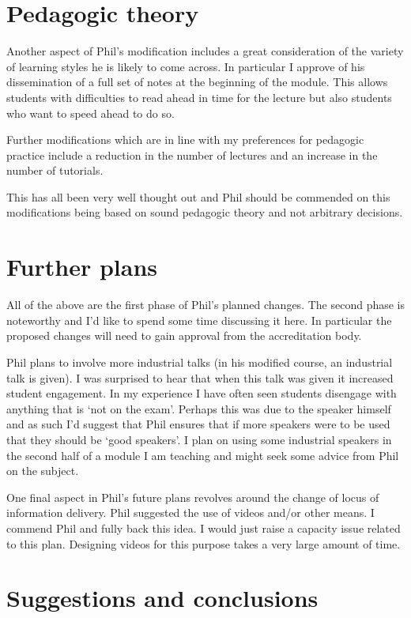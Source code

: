 \documentclass{article}
\begin{document}
\section{Pedagogic theory}

Another aspect of Phil's modification includes a great consideration of the variety of learning styles he is likely to come across. In particular I approve of his dissemination of a full set of notes at the beginning of the module. This allows students with difficulties to read ahead in time for the lecture but also students who want to speed ahead to do so.

Further modifications which are in line with my preferences for pedagogic practice include a reduction in the number of lectures and an increase in the number of tutorials.

This has all been very well thought out and Phil should be commended on this modifications being based on sound pedagogic theory and not arbitrary decisions.

\section{Further plans}

All of the above are the first phase of Phil's planned changes. The second phase is noteworthy and I'd like to spend some time discussing it here. In particular the proposed changes will need to gain approval from the accreditation body.

Phil plans to involve more industrial talks (in his modified course, an industrial talk is given). I was surprised to hear that when this talk was given it increased student engagement. In my experience I have often seen students disengage with anything that is `not on the exam'. Perhaps this was due to the speaker himself and as such I'd suggest that Phil ensures that if more speakers were to be used that they should be `good speakers'. I plan on using some industrial speakers in the second half of a module I am teaching and might seek some advice from Phil on the subject.

One final aspect in Phil's future plans revolves around the change of locus of information delivery. Phil suggested the use of videos and/or other means. I commend Phil and fully back this idea. I would just raise a capacity issue related to this plan. Designing videos for this purpose takes a very large amount of time.

\section{Suggestions and conclusions}
\end{document}
